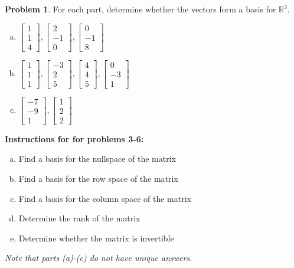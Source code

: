 \documentclass[10pt]{article}
\theoremstyle{definition}
\newtheorem{problem}[theorem]{Problem}
\newcommand{\1}[1]{\textbf{1}_{\left[#1\right]}} %
\def\R{\mathbb{R}} %
\begin{document}
\begin{problem}
  For each part, determine whether the vectors form a basis for $\R^{3}$.
  \begin{enumerate}[(a)]
    \item $
    \begin{bmatrix}
      1\\1\\4
    \end{bmatrix},
    \begin{bmatrix}
      2\\-1\\0
    \end{bmatrix},
    \begin{bmatrix}
      0\\-1\\8
    \end{bmatrix}
    $
    \item $
    \begin{bmatrix}
      1\\1\\1
    \end{bmatrix},
    \begin{bmatrix}
      -3\\2\\5
    \end{bmatrix},
    \begin{bmatrix}
      4\\4\\5
    \end{bmatrix},
    \begin{bmatrix}
      0\\-3\\1
    \end{bmatrix}
    $
    \item $
    \begin{bmatrix}
      -7\\-9\\1
    \end{bmatrix},
    \begin{bmatrix}
      1\\2\\2
    \end{bmatrix}
    $
  \end{enumerate}
\end{problem}
\noindent \textbf{Instructions for for problems 3-6:}
\begin{enumerate}[(a)]
  \item Find a basis for the nullspace of the matrix
  \item Find a basis for the row space of the matrix
  \item Find a basis for the column space of the matrix
  \item Determine the rank of the matrix
  \item Determine whether the matrix is invertible
\end{enumerate}
\textit{Note that parts (a)-(c) do not have unique answers.}
\end{document}
